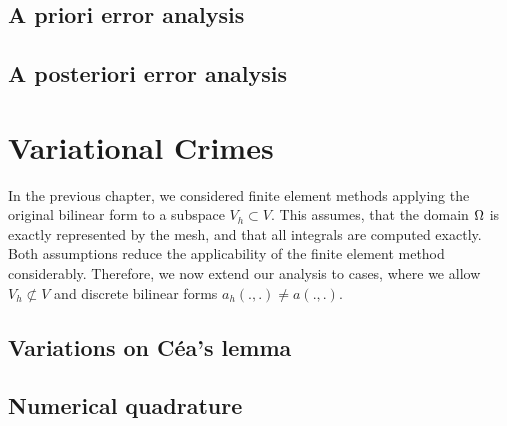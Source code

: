 \section{A priori error analysis}

\section{A posteriori error analysis}


\chapter{Variational Crimes}
\begin{intro}
  In the previous chapter, we considered finite element methods
  applying the original bilinear form to a subspace $V_h\subset
  V$. This assumes, that the domain $\Omega$ is exactly represented
  by the mesh, and that all integrals are computed exactly. Both
  assumptions reduce the applicability of the finite element method
  considerably. Therefore, we now extend our analysis to cases, where
  we allow $V_h \not\subset V$ and discrete bilinear forms
  $a_h(.,.) \neq a(.,.)$.
\end{intro}
\section{Variations on Céa's lemma}


\section{Numerical quadrature}


%

%
%



\printindex

